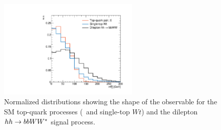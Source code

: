 \begin{figure}[!htb]
    \begin{center}
        \includegraphics[width=0.6\textwidth]{figures/search_hh/signal_pheno/shape_plots/hh_shape_plot_mt2_bb}
        \caption{
            Normalized distributions showing the shape of the \mtbb observable for the SM
            top-quark processes (\ttbar~and single-top $Wt$) and the dilepton $hh \rightarrow bbWW^*$ signal process.
        }
        \label{fig:hh_shape_mtbb}
    \end{center}
\end{figure}
